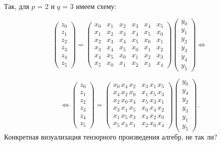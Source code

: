 \documentclass{mai_book}
\begin{document}
Так, для $p$ = 2 и $q$ = 3 имеем схему: 

\[ 
\begin{pmatrix} 
z_0 \\ 
z_1 \\ 
z_2 \\ 
z_3 \\ 
z_4 \\ 
z_5
\end{pmatrix} = 
\begin{pmatrix} 
x_0 & x_1 & x_2 & x_3 & x_4 & x_5 \\ 
x_1 & x_2 & x_3 & x_4 & x_5 & x_0 \\ 
x_2 & x_3 & x_4 & x_5 & x_0 & x_1 \\ 
x_3 & x_4 & x_5 & x_0 & x_1 & x_2 \\ 
x_4 & x_5 & x_0 & x_1 & x_2 & x_3 \\ 
x_5 & x_0 & x_1 & x_2 & x_3 & x_4
\end{pmatrix} 
\begin{pmatrix} 
y_0 \\ 
y_1 \\ 
y_2 \\ 
y_3 \\ 
y_4 \\ 
y_5
\end{pmatrix} \Longleftrightarrow
\] 

\[ 
\Longleftrightarrow
\begin{pmatrix} 
z_0 \\ 
z_1 \\ 
z_2 \\ 
z_3 \\ 
z_4 \\ 
z_5
\end{pmatrix} = 
\begin{pmatrix} 
x_0 \, x_4 \, x_2 & x_3 \, x_1 \, x_5 \\ 
x_4 \, x_2 \, x_0 & x_1 \, x_5 \, x_3 \\ 
x_2 \, x_0 \, x_4 & x_5 \, x_3 \, x_1 \\ 
x_3 \, x_1 \, x_5 & x_0 \, x_4 \, x_2 \\ 
x_1 \, x_5 \, x_3 & x_4 \, x_2 \, x_0 \\ 
x_5 \, x_3 \, x_1 & x_2 \, x_0 \, x_4
\end{pmatrix} 
\begin{pmatrix} 
y_0 \\ 
y_4 \\ 
y_2 \\ 
y_3 \\ 
y_1 \\ 
y_5
\end{pmatrix}.
\] 
Конкретная визуализация тензорного произведения алгебр, не так ли? \ 
\end{document}
